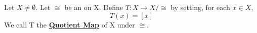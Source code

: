 \newcommand{\QuotientMap}[0]{\textbf{\hyperref[df:quotient_map]{Quotient Map}}\xspace}
    
 \newcommand{\QuotientMapInstance}[3]{ #1 : #2\to #2/#3 }
\begin{df}
\label{df:quotient_map}
\rm
    Let $X \neq \emptyset$.
    Let $\cong$ be an 
	\EquivalenceRelation 
	on X.
    Define $T:X \to X/\cong$ by setting, for each $x \in X$, 
    \begin{equation}
        T(x)=[x]
    \end{equation}    
    We call T the \QuotientMap of X under $\cong$. 
\end{df} 
